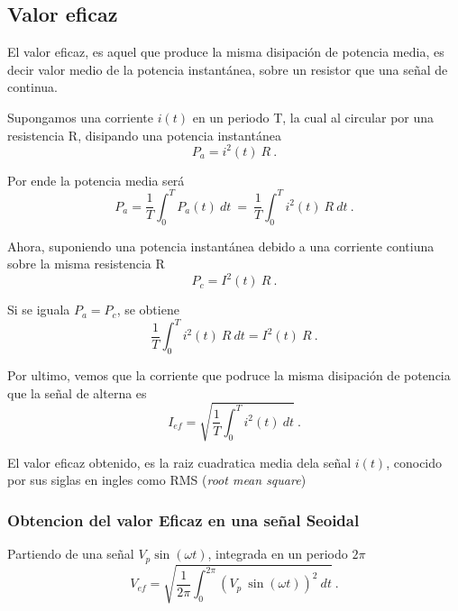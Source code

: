 \subsection{Valor eficaz}

    El valor eficaz, es aquel que produce la misma disipación de potencia 
    media, es decir valor medio de la potencia instantánea, sobre un 
    resistor que una señal de continua.
    
    \noindent Supongamos una corriente \(i(t)\) en un periodo T, la cual 
    al circular por una resistencia R, disipando una potencia instantánea 
    \begin{equation*}
        P_a = i^2(t)~R~.
    \end{equation*}

    \noindent Por ende la potencia media será
    \begin{equation*}
        P_a = \dfrac{1}{T} \int_{0}^{T} P_a(t)~dt ~ = ~ 
        \dfrac{1}{T} \int_{0}^{T} i^2(t)~R~dt ~.
    \end{equation*}

    \noindent Ahora, suponiendo una potencia instantánea debido a una 
    corriente contiuna sobre la misma resistencia R
    \begin{equation*}
        P_c = I^2(t)~R~.
    \end{equation*} 

    \noindent Si se iguala \(P_a = P_c\), se obtiene 
    \begin{equation*}
        \dfrac{1}{T} \int_{0}^{T} i^2(t)~R~dt = I^2(t)~R~.    
    \end{equation*}

    \noindent Por ultimo, vemos que la corriente que podruce la
    misma disipación de potencia que la señal de alterna es 
    \begin{equation*}
        I_{ef} = \sqrt{\dfrac{1}{T} \int_{0}^{T} i^2(t)~dt}~.
    \end{equation*}

    \noindent El valor eficaz obtenido, es la raiz cuadratica media
    dela señal \(i(t)\), conocido por sus siglas en ingles como RMS 
    (\textit{root mean square}) 

        \subsubsection{Obtencion del valor Eficaz en una señal Seoidal}

            Partiendo de una señal \(V_p\sin(\omega t)\), integrada en un 
            periodo \(2\pi\)
            \begin{equation*}
                V_{ef} = \sqrt{\dfrac{1}{2\pi} \int_{0}^{2\pi} (V_p~\sin(\omega t))^2~dt}~.        
            \end{equation*}
            
